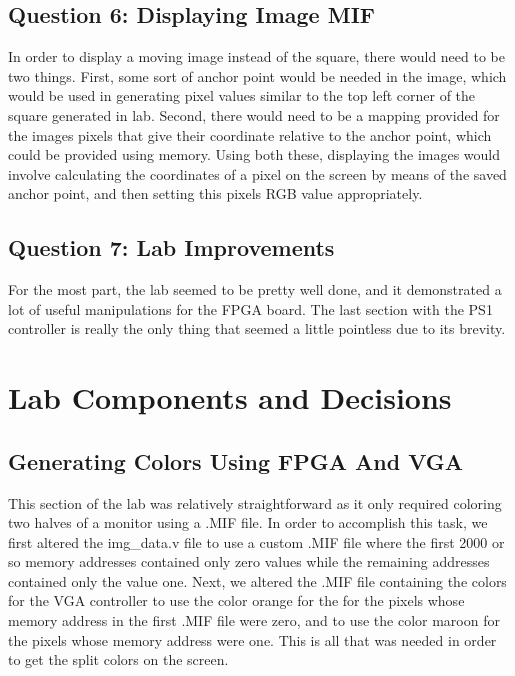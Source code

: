 \documentclass[letterpaper]{article} %
\begin{document}
    \subsection{Question 6: Displaying Image MIF}
        In order to display a moving image instead of the square, there would need to be two things. First, some sort of anchor point would be needed in the image, which would be used in generating pixel values similar to the top left corner of the square generated in lab. Second, there would need to be a mapping provided for the images pixels that give their coordinate relative to the anchor point, which could be provided using memory. Using both these, displaying the images would involve calculating the coordinates of a pixel on the screen by means of the saved anchor point, and then setting this pixels RGB value appropriately.
        
    \subsection{Question 7: Lab Improvements}
        For the most part, the lab seemed to be pretty well done, and it demonstrated a lot of useful manipulations for the FPGA board. The last section with the PS1 controller is really the only thing that seemed a little pointless due to its brevity.
\section{Lab Components and Decisions}
    \subsection{Generating Colors Using FPGA And VGA}
        This section of the lab was relatively straightforward as it only required coloring two halves of a monitor using a .MIF file. In order to accomplish this task, we first altered the img\_data.v file to use a custom .MIF file where the first 2000 or so memory addresses contained only zero values while the remaining addresses contained only the value one. Next, we altered the .MIF file containing the colors for the VGA controller to use the color orange for the for the pixels whose memory address in the first .MIF file were zero, and to use the color maroon for the pixels whose memory address were one. This is all that was needed in order to get the split colors on the screen.
\end{document}
